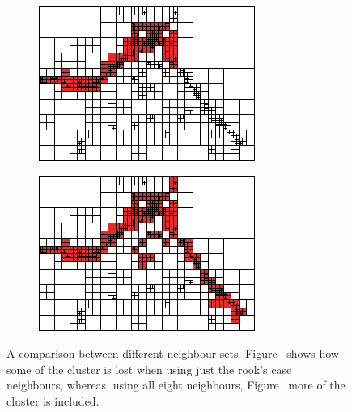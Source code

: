 \begin{figure}[ht]
	\centering
	\begin{subfigure}[b]{0.48\linewidth}
		\includegraphics[width=\textwidth]{clusters/kernel-rooks-case.png}
		\caption{}\label{fig:kernel-rooks-case}
	\end{subfigure}%
	\quad
	\begin{subfigure}[b]{0.48\linewidth}
		\includegraphics[width=\textwidth]{clusters/kernel-all8.png}
		\caption{}\label{fig:kernel-all8}
	\end{subfigure}
	\caption{A comparison between different neighbour sets.
		Figure~ shows how some of the cluster is
		lost when using just the rook's case neighbours, whereas, using all
		eight neighbours, Figure~ more of the cluster
		is included.}\label{fig:kernel-options}
\end{figure}
